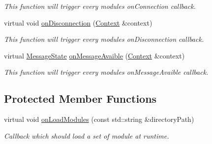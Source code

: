 \begin{DoxyCompactItemize}
\begin{DoxyCompactList}\small\item\em This function will trigger every module\textquotesingle{}s \textquotesingle{}on\+Connection\textquotesingle{} callback. \end{DoxyCompactList}\item 
virtual void \mbox{\hyperlink{classo_z_1_1_pipeline_a4245ad0f1fb310cf19986dbaf0bff3d2}{on\+Disconnection}} (\mbox{\hyperlink{classo_z_1_1_context}{Context}} \&context)
\begin{DoxyCompactList}\small\item\em This function will trigger every module\textquotesingle{}s \textquotesingle{}on\+Disconnection\textquotesingle{} callback. \end{DoxyCompactList}\item 
virtual \mbox{\hyperlink{namespaceo_z_aca1addfd2374772c2b5db4bc5a96422c}{Message\+State}} \mbox{\hyperlink{classo_z_1_1_pipeline_a9268d41077921fdb894aaf4cfa70d704}{on\+Message\+Avaible}} (\mbox{\hyperlink{classo_z_1_1_context}{Context}} \&context)
\begin{DoxyCompactList}\small\item\em This function will trigger every module\textquotesingle{}s \textquotesingle{}on\+Message\+Avaible\textquotesingle{} callback. \end{DoxyCompactList}\end{DoxyCompactItemize}
\subsection*{Protected Member Functions}
\begin{DoxyCompactItemize}
\item 
virtual void \mbox{\hyperlink{classo_z_1_1_pipeline_a0265d90a5540e69b25069d5d96973c53}{on\+Load\+Modules}} (const std\+::string \&directory\+Path)
\begin{DoxyCompactList}\small\item\em Callback which should load a set of module at runtime. \end{DoxyCompactList}\end{DoxyCompactItemize}
